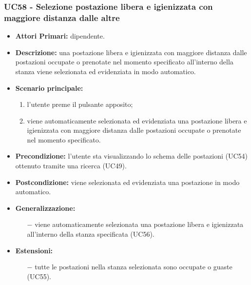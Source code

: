 \subsubsection{ UC58 - Selezione postazione libera e igienizzata con maggiore distanza dalle altre}
\begin{itemize}
	\item\textbf{Attori Primari:} dipendente.
	\item\textbf{Descrizione:} una postazione libera e igienizzata con maggiore distanza dalle postazioni occupate o prenotate nel momento specificato all'interno della stanza viene selezionata ed evidenziata in modo automatico.
	\item\textbf{Scenario principale:}
	\begin{enumerate}
		\item l'utente preme il pulsante apposito;
		\item viene automaticamente selezionata ed evidenziata una postazione libera e igienizzata con maggiore distanza dalle postazioni occupate o prenotate nel momento specificato.
	\end{enumerate}
	\item\textbf{Precondizione:} l’utente sta visualizzando lo schema delle postazioni (UC54) ottenuto tramite una ricerca (UC49).
	\item\textbf{Postcondizione:} viene selezionata ed evidenziata una postazione in modo automatico.
	\item\textbf{Generalizzazione:}
	\begin{itemize}
		\item[$-$] viene automaticamente selezionata una postazione libera e igienizzata all'interno della stanza specificata (UC56).
	\end{itemize}
	\item\textbf{Estensioni:}
	\begin{itemize}
		\item[$-$] tutte le postazioni nella stanza selezionata sono occupate o guaste (UC55).
	\end{itemize}
\end{itemize}

